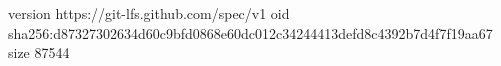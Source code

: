 version https://git-lfs.github.com/spec/v1
oid sha256:d87327302634d60c9bfd0868e60dc012c34244413defd8c4392b7d4f7f19aa67
size 87544
